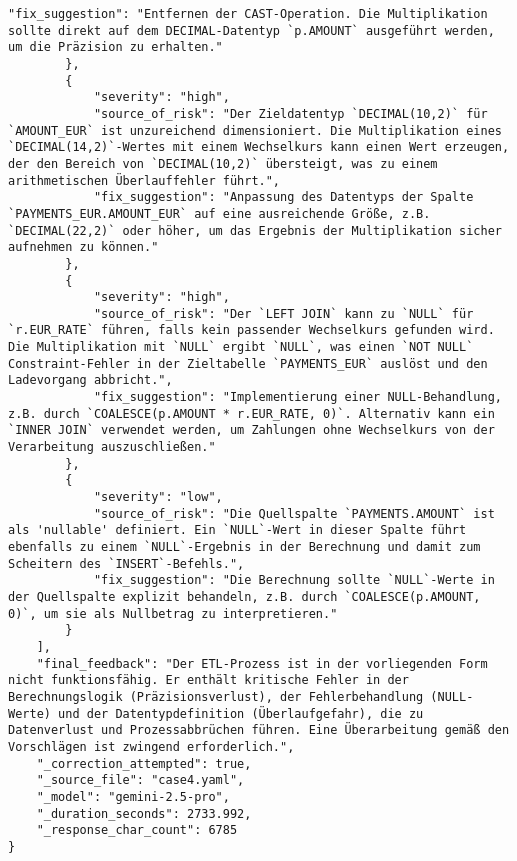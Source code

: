 \begin{lstlisting}[caption={Ausgabe: GEMINI 2.5 Pro Anwendungsfall 4 Robustheitsdurchlauf},label={gemini_case4_prompt3}]
            "fix_suggestion": "Entfernen der CAST-Operation. Die Multiplikation sollte direkt auf dem DECIMAL-Datentyp `p.AMOUNT` ausgeführt werden, um die Präzision zu erhalten."
        },
        {
            "severity": "high",
            "source_of_risk": "Der Zieldatentyp `DECIMAL(10,2)` für `AMOUNT_EUR` ist unzureichend dimensioniert. Die Multiplikation eines `DECIMAL(14,2)`-Wertes mit einem Wechselkurs kann einen Wert erzeugen, der den Bereich von `DECIMAL(10,2)` übersteigt, was zu einem arithmetischen Überlauffehler führt.",
            "fix_suggestion": "Anpassung des Datentyps der Spalte `PAYMENTS_EUR.AMOUNT_EUR` auf eine ausreichende Größe, z.B. `DECIMAL(22,2)` oder höher, um das Ergebnis der Multiplikation sicher aufnehmen zu können."
        },
        {
            "severity": "high",
            "source_of_risk": "Der `LEFT JOIN` kann zu `NULL` für `r.EUR_RATE` führen, falls kein passender Wechselkurs gefunden wird. Die Multiplikation mit `NULL` ergibt `NULL`, was einen `NOT NULL` Constraint-Fehler in der Zieltabelle `PAYMENTS_EUR` auslöst und den Ladevorgang abbricht.",
            "fix_suggestion": "Implementierung einer NULL-Behandlung, z.B. durch `COALESCE(p.AMOUNT * r.EUR_RATE, 0)`. Alternativ kann ein `INNER JOIN` verwendet werden, um Zahlungen ohne Wechselkurs von der Verarbeitung auszuschließen."
        },
        {
            "severity": "low",
            "source_of_risk": "Die Quellspalte `PAYMENTS.AMOUNT` ist als 'nullable' definiert. Ein `NULL`-Wert in dieser Spalte führt ebenfalls zu einem `NULL`-Ergebnis in der Berechnung und damit zum Scheitern des `INSERT`-Befehls.",
            "fix_suggestion": "Die Berechnung sollte `NULL`-Werte in der Quellspalte explizit behandeln, z.B. durch `COALESCE(p.AMOUNT, 0)`, um sie als Nullbetrag zu interpretieren."
        }
    ],
    "final_feedback": "Der ETL-Prozess ist in der vorliegenden Form nicht funktionsfähig. Er enthält kritische Fehler in der Berechnungslogik (Präzisionsverlust), der Fehlerbehandlung (NULL-Werte) und der Datentypdefinition (Überlaufgefahr), die zu Datenverlust und Prozessabbrüchen führen. Eine Überarbeitung gemäß den Vorschlägen ist zwingend erforderlich.",
    "_correction_attempted": true,
    "_source_file": "case4.yaml",
    "_model": "gemini-2.5-pro",
    "_duration_seconds": 2733.992,
    "_response_char_count": 6785
}
\end{lstlisting}

